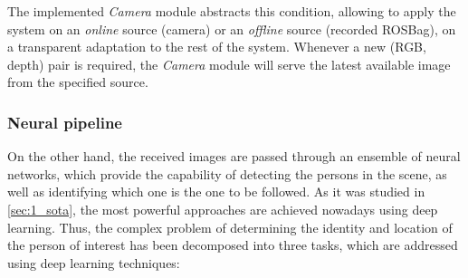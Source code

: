 The implemented \textit{Camera} module abstracts this condition, allowing to apply the system on an \textit{online} source (camera) or an \textit{offline} source (recorded ROSBag), on a transparent adaptation to the rest of the system. Whenever a new (RGB, depth) pair is required, the \textit{Camera} module will serve the latest available image from the specified source.\\

\subsubsection{Neural pipeline}

On the other hand, the received images are passed through an ensemble of neural networks, which provide the capability of detecting the persons in the scene, as well as identifying which one is the one to be followed. As it was studied in \autoref{sec:1_sota}, the most powerful approaches are achieved nowadays using deep learning. Thus, the complex problem of determining the identity and location of the person of interest has been decomposed into three tasks, which are addressed using deep learning techniques:
